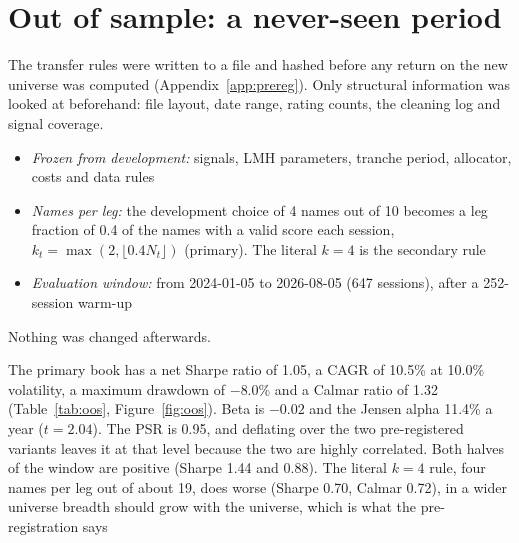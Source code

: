 \section{Out of sample: a never-seen period}\label{sec:oos}

 The transfer rules were written to a file and hashed before any return on the new universe was computed (Appendix~\ref{app:prereg}). Only structural information was looked at beforehand: file layout, date range, rating counts, the cleaning log and signal coverage.
\begin{itemize}
  \item \emph{Frozen from development:} signals, LMH parameters, tranche period, allocator, costs and data rules
  \item \emph{Names per leg:} the development choice of 4 names out of 10 becomes a leg fraction of 0.4 of the names with a valid score each session, $k_t=\max(2,\lfloor 0.4N_t\rfloor)$ (primary). The literal $k=4$ is the secondary rule
  \item \emph{Evaluation window:} from 2024-01-05 to 2026-08-05 (647 sessions), after a 252-session warm-up
\end{itemize}
Nothing was changed afterwards.

 The primary book has a net Sharpe ratio of 1.05, a CAGR of 10.5\% at 10.0\% volatility, a maximum drawdown of $-8.0\%$ and a Calmar ratio of 1.32 (Table~\ref{tab:oos}, Figure~\ref{fig:oos}). Beta is $-0.02$ and the Jensen alpha 11.4\% a year ($t = 2.04$). The PSR is 0.95, and deflating over the two pre-registered variants leaves it at that level because the two are highly correlated. Both halves of the window are positive (Sharpe 1.44 and 0.88). The literal $k=4$ rule, four names per leg out of about 19, does worse (Sharpe 0.70, Calmar 0.72), in a wider universe breadth should grow with the universe, which is what the pre-registration says

